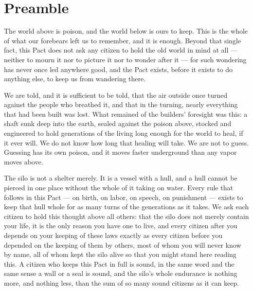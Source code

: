 \chapter*{Preamble}


The world above is poison, and the world below is ours to keep. This is the whole of what our forebears left us to remember, and it is enough. Beyond that single fact, this Pact does not ask any citizen to hold the old world in mind at all --- neither to mourn it nor to picture it nor to wonder after it --- for such wondering has never once led anywhere good, and the Pact exists, before it exists to do anything else, to keep us from wandering there.

We are told, and it is sufficient to be told, that the air outside once turned against the people who breathed it, and that in the turning, nearly everything that had been built was lost. What remained of the builders' foresight was this: a shaft sunk deep into the earth, sealed against the poison above, stocked and engineered to hold generations of the living long enough for the world to heal, if it ever will. We do not know how long that healing will take. We are not to guess. Guessing has its own poison, and it moves faster underground than any vapor moves above.

The silo is not a shelter merely. It is a vessel with a hull, and a hull cannot be pierced in one place without the whole of it taking on water. Every rule that follows in this Pact --- on birth, on labor, on speech, on punishment --- exists to keep that hull whole for as many turns of the generations as it takes. We ask each citizen to hold this thought above all others: that the silo does not merely contain your life, it is the only reason you have one to live, and every citizen after you depends on your keeping of these laws exactly as every citizen before you depended on the keeping of them by others, most of whom you will never know by name, all of whom kept the silo alive so that you might stand here reading this. A citizen who keeps this Pact in full is sound, in the same word and the same sense a wall or a seal is sound, and the silo's whole endurance is nothing more, and nothing less, than the sum of so many sound citizens as it can keep.

